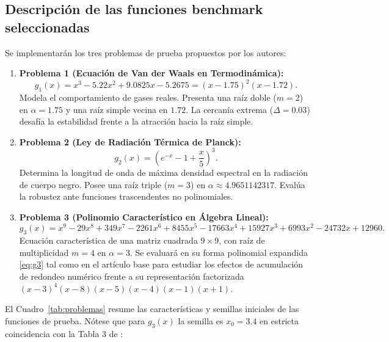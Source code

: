\documentclass[10pt, a4paper]{article}
\begin{document}
\subsection{Descripción de las funciones benchmark seleccionadas}
Se implementarán los tres problemas de prueba propuestos por los autores:
\begin{enumerate}
    \item \textbf{Problema 1 (Ecuación de Van der Waals en Termodinámica):}
    \begin{equation}
        g_1(x) = x^3 - 5.22 x^2 + 9.0825 x - 5.2675 = (x - 1.75)^2 (x - 1.72). \label{eq:g1}
    \end{equation}
    Modela el comportamiento de gases reales. Presenta una raíz doble ($m=2$) en $\alpha = 1.75$ y una raíz simple vecina en $1.72$. La cercanía extrema ($\Delta = 0.03$) desafía la estabilidad frente a la atracción hacia la raíz simple.
    \item \textbf{Problema 2 (Ley de Radiación Térmica de Planck):}
    \begin{equation}
        g_2(x) = \left( e^{-x} - 1 + \frac{x}{5} \right)^3. \label{eq:g2}
    \end{equation}
    Determina la longitud de onda de máxima densidad espectral en la radiación de cuerpo negro. Posee una raíz triple ($m=3$) en $\alpha \approx 4.9651142317$. Evalúa la robustez ante funciones trascendentes no polinomiales.
    \item \textbf{Problema 3 (Polinomio Característico en Álgebra Lineal):}
    \begin{equation}
        g_3(x) = x^9 - 29x^8 + 349x^7 - 2261x^6 + 8455x^5 - 17663x^4 + 15927x^3 + 6993x^2 - 24732x + 12960. \label{eq:g3}
    \end{equation}
    Ecuación característica de una matriz cuadrada $9 \times 9$, con raíz de multiplicidad $m=4$ en $\alpha = 3$. Se evaluará en su forma polinomial expandida \eqref{eq:g3} tal como en el artículo base para estudiar los efectos de acumulación de redondeo numérico frente a su representación factorizada $(x-3)^4 (x-8)(x-5)(x-4)(x-1)(x+1)$.
\end{enumerate}

El Cuadro~\ref{tab:problemas} resume las características y semillas iniciales de las funciones de prueba. Nótese que para $g_3(x)$ la semilla es $x_0 = 3.4$ en estricta coincidencia con la Tabla 3 de \cite{Jerezano2026}:
\end{document}
